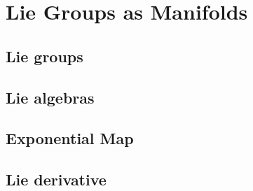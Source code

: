 
\section{Lie Groups as Manifolds}
\label{Section5}

\subsection{Lie groups}
\subsection{Lie algebras}
\subsection{Exponential Map}
\subsection{Lie derivative}

\cleardoublepage
